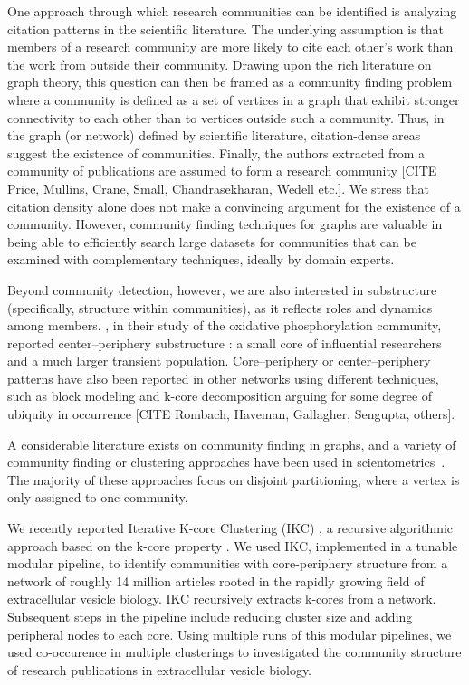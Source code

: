 \documentclass[11pt, oneside]{article}   	%
\begin{document}
One approach through which research communities can be identified is analyzing citation patterns in the scientific literature. The underlying assumption is that members of a research community are more likely to cite each other's work than the work from outside their community.  Drawing upon the rich literature on graph theory, this question can then be framed as a community finding problem where a community is defined as a set of vertices in a graph that exhibit stronger connectivity to each other than to vertices outside such a community. Thus, in the graph (or network) defined by scientific literature, citation-dense areas suggest the existence of communities. Finally, the authors extracted from a community of publications are assumed to form a research community [CITE Price, Mullins, Crane, Small, Chandrasekharan, Wedell etc.]. We stress that citation density alone does not make a convincing argument for the existence of a community. However, community finding techniques for graphs are valuable in being able to efficiently search large datasets for communities that can be examined with complementary techniques, ideally by domain experts.

Beyond community detection, however, we are also interested in substructure (specifically, structure within communities), as it reflects roles and dynamics among members. \cite{Price1966}, in their study of the oxidative phosphorylation community, reported center–periphery substructure \citep{Breiger2014}: a small core of influential researchers and a much larger transient population. 
Core–periphery or center–periphery patterns have also been reported in other networks using different techniques, such as block modeling and k-core decomposition arguing for some degree of ubiquity in occurrence [CITE Rombach, Haveman, Gallagher, Sengupta, others]. 

A considerable literature exists on community finding in graphs, and a variety of community finding or clustering approaches have been used in scientometrics~\citep{Newman2006,Fortunato2009,Boyack2010,Boyack2019,Traag2019,Ahlgren2020,Chandrasekharan2021,Wedell2022}. The majority of these approaches focus on disjoint partitioning, where a vertex is only assigned to one community. 

We recently reported Iterative K-core Clustering (IKC) \citep{Wedell2022}, a recursive algorithmic approach based on the k-core property \citep{Giatsidis2011,malliaros2019}. 
We used IKC, implemented in a tunable modular pipeline, to identify communities with core-periphery structure from a network of roughly 14 million articles rooted in the rapidly growing field of extracellular vesicle biology. IKC recursively extracts k-cores from a network. Subsequent steps in the pipeline include reducing cluster size and adding peripheral nodes to each core. 
Using multiple runs of this modular pipelines, we used co-occurence in multiple clusterings to investigated the community structure of research publications in extracellular vesicle biology. 
\end{document}
